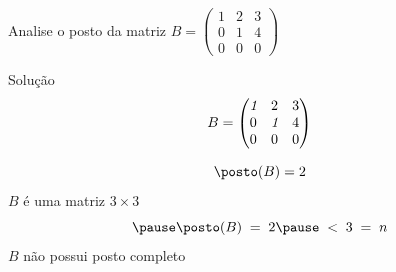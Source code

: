 \begin{question}
  Analise o posto da matriz
  \quad
  \(
    B =
    \begin{pmatrix}
      1 & 2 & 3 \\
      0 & 1 & 4 \\
      0 & 0 & 0
    \end{pmatrix}
  \)
\end{question}

\begin{resolution}{Solução}
  \[
    B =
    \begin{pmatrix}
      \emph{1} & 2        & 3 \\
      0        & \emph{1} & 4 \\
      0        & 0        & 0
    \end{pmatrix}
  \]

  \pause
  \[
    \posto(B) = 2
  \]
  \pause
  $B$ é uma matriz $3 \times 3$
  \[
    \pause
    \posto(B)
    \;=\;
    2
    \pause
    \;<\;
    3
    \;=\;
    n
  \]
  \pause
  $B$ não possui posto completo
\end{resolution}

\endinput
